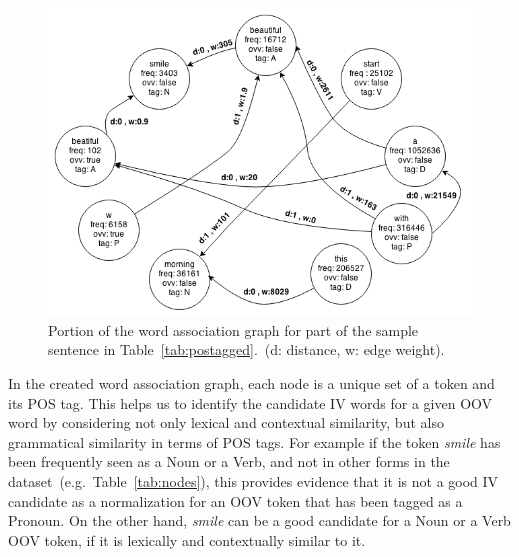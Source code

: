 \documentclass[a4paper,onesided,12pt]{report}
\begin{document}
\begin{figure}[htb]
\begin{center}
\includegraphics[scale=0.7]{fig/graph}
\caption{Portion of the word association graph for part of the sample sentence in Table~\ref{tab:postagged}.~(d: distance, w: edge weight).}
\label{fig:graph}
\end{center}
\end{figure}



In the created word association graph, each node is a unique set of a token and its POS tag. This helps us to identify the candidate IV words for a given OOV word by considering not only lexical and contextual similarity, but also grammatical similarity in terms of POS tags. For example if the token \textit{smile} has been frequently seen as a Noun or a Verb, and not in other forms in the dataset~(e.g.~Table~\ref{tab:nodes}), this provides evidence that it is not a good IV candidate as a normalization for an OOV token that has  been tagged as a Pronoun. On the other hand, \textit{smile} can be a good candidate for a Noun or a Verb OOV token, if it is lexically and contextually similar to it.
\end{document}
